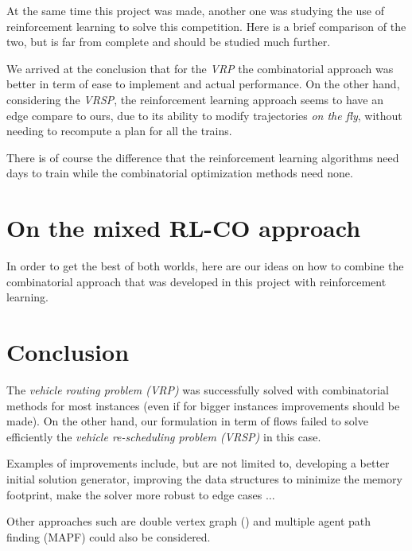 \documentclass[14pt,a4paper]{article}
\theoremstyle{definition}
\numberwithin{equation}{subsection}
\begin{document}
At the same time this project was made, another one was studying the use of reinforcement learning to solve this competition. Here is a brief comparison of the two, but is far from complete and should be studied much further.

We arrived at the conclusion that for the \emph{VRP}  the combinatorial approach was better in term of ease to implement and actual performance. On the other hand, considering the \emph{VRSP}, the reinforcement learning approach seems to have an edge compare to ours, due to its ability to modify trajectories \emph{on the fly}, without needing to recompute a plan for all the trains.

There is of course the difference that the reinforcement learning algorithms need days to train while the combinatorial optimization methods need none. 


\newpage
\section{On the mixed RL-CO approach}

In order to get the best of both worlds, here are our ideas on how to combine the combinatorial approach that was developed in this project with reinforcement learning.

\todo[inline]{\blindtext}





\section*{Conclusion}
\label{sec:conclusion}

The \emph{vehicle routing problem (VRP)} was successfully  solved with combinatorial methods for most instances (even if for bigger instances improvements should be made). On the other hand, our formulation in term of flows failed to solve efficiently the \emph{vehicle re-scheduling problem (VRSP)} in this case.


Examples of improvements include, but are not limited to, developing a better initial solution generator, improving the data structures to minimize the memory footprint, make the solver more robust to edge cases $\ldots$ 


Other approaches such are double vertex graph (\cite{BachelorThesis}) and multiple agent path finding (MAPF) could also be considered.
\end{document}
